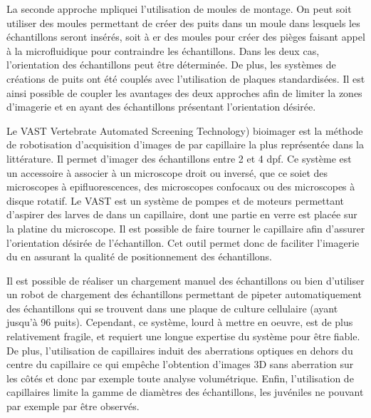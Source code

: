 \documentclass[\main/main.tex]{subfiles}
\begin{document}
%
\label{sec:moule_montage}
La seconde approche mpliquei l'utilisation de moules de montage.
%
On peut soit utiliser des moules permettant de créer des puits dans un moule dans lesquels les échantillons seront insérés\cite{donoughe_2018,kleinhans_2019}, soit à er des moules pour créer des pièges faisant appel à la microfluidique pour contraindre les échantillons\cite{khalili_2019}. Dans les deux cas, l'orientation des échantillons peut être déterminée.
%
De plus, les systèmes de créations de puits ont été couplés avec l'utilisation de plaques standardisées\cite{wittbrodt_2014}.
%
Il est ainsi possible de coupler les avantages des deux approches afin de limiter la zones d'imagerie et en ayant des échantillons présentant l'orientation désirée.

\label{sec:vast}
Le VAST Vertebrate Automated Screening Technology) bioimager\cite{pardomartin_2010} est la méthode de robotisation d'acquisition d'images de \pz{} par capillaire la plus représentée dans la littérature\cite{jarque_2018,teixid_2019}. Il permet d'imager des échantillons entre 2 et 4 dpf.
%
Ce système est un accessoire à associer à un microscope droit ou inversé, que ce soiet des microscopes à epifluorescences, des microscopes confocaux ou des microscopes à disque rotatif\cite{early_2018, guo_2017}.
%
Le VAST est un système de pompes et de moteurs permettant d'aspirer des larves de \pz{} dans un capillaire, dont une partie en verre est placée sur la platine du microscope. 
%
Il est possible de faire tourner le capillaire afin d'assurer l'orientation désirée de l'échantillon.
%
Cet outil permet donc de faciliter l'imagerie du \pz{} en assurant la qualité de positionnement des échantillons.

%
Il est possible de réaliser un chargement manuel des échantillons ou bien d'utiliser un robot de chargement des échantillons permettant de pipeter automatiquement des échantillons qui se trouvent dans une plaque de culture cellulaire (ayant jusqu'à 96 puits).
%
Cependant, ce système, lourd à mettre en oeuvre, est de plus relativement fragile, et requiert une longue expertise du système pour être fiable.
De plus, l'utilisation de capillaires induit des aberrations optiques en dehors du centre du capillaire ce qui empêche l'obtention d'images 3D sans aberration sur les côtés et donc par exemple toute analyse volumétrique. Enfin, l'utilisation de capillaires limite la gamme de diamètres des échantillons, les juvéniles ne pouvant par exemple par être observés.
\end{document}
